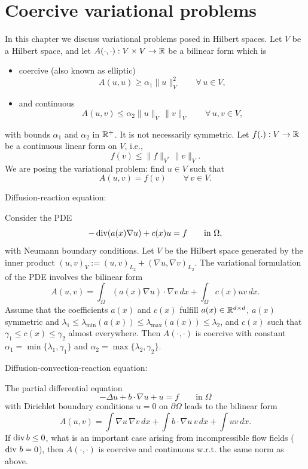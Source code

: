 \section{Coercive variational problems}
%
In this chapter we discuss variational problems posed in Hilbert spaces.
Let $V$ be a Hilbert space, and let $A(\cdot,\cdot) : V \times V \rightarrow {\mathbb R}$ be
a bilinear form which is
\begin{itemize}
\item coercive (also known as elliptic)
\begin{equation}
A(u,u) \geq \alpha_1 \| u \|_V^2 \qquad \forall \, u \in V,
\end{equation}
\item and continuous
\begin{equation}
A(u,v) \leq \alpha_2 \| u \|_V  \, \| v \|_V \qquad \forall \, u , v \in V,
\end{equation}
\end{itemize}
with bounds $\alpha_1$ and $\alpha_2$ in ${\mathbb R}^+$. It is not necessarily symmetric.
Let $f(.) : V \rightarrow {\mathbb R}$ be a continuous linear form on $V$, i.e., 
$$
f(v) \leq \| f \|_{V^\ast} \| v \|_V.
$$
We are posing the variational problem: find $u \in V$ such that
$$
A(u,v) = f(v) \qquad \forall \, v \in V.
$$

\begin{example} 
Diffusion-reaction equation: 
\end{example}
\noindent
Consider the PDE
$$
-\operatorname{div} (a(x) \nabla u) + c(x) u = f \qquad \mbox{in } \Omega,
$$
with Neumann boundary conditions. Let $V$ be the Hilbert space generated 
by the inner product $(u,v)_V := (u,v)_{L_2}+ (\nabla u , \nabla v)_{L_2}$. 
The variational formulation of the PDE involves the bilinear form
$$
A(u,v) = \int_{\Omega} (a(x) \nabla u) \cdot \nabla v \, dx + \int_\Omega c(x) u v \, dx.
$$
Assume that the coefficients $a(x)$ and $c(x)$ fulfill 
$a(x) \in {\mathbb R}^{d \times d}$, $a(x)$ symmetric and $\lambda_1 \leq \lambda_{\min} (a(x)) \leq \lambda_{\max} (a(x)) \leq \lambda_2$, and 
$c(x)$ such that $\gamma_1 \leq c(x) \leq \gamma_2$ almost everywhere. 
Then $A(\cdot,\cdot)$ is coercive with constant
$\alpha_1 = \min \{ \lambda_1, \gamma_1 \}$ and $\alpha_2 = \max \{ \lambda_2, \gamma_2 \}$.
\begin{example}  \label{example_diffconv}
Diffusion-convection-reaction equation:
\end{example}
\noindent
The partial differential equation
$$
-\Delta u + b \cdot \nabla u + u  = f \qquad \mbox{in} \; \Omega
$$
with Dirichlet boundary conditions $u = 0$ on $\partial \Omega$ leads to the
bilinear form
$$
A(u,v) = \int \nabla u \, \nabla v \, dx + \int b \cdot \nabla u \, v \, dx + \int u v \, dx.
$$
If $\operatorname{div} b \leq 0$, what is an important case arising from incompressible flow
fields ($\operatorname{div} \, b = 0$), then $A(\cdot,\cdot)$ is coercive and continuous w.r.t. the same norm as above.

